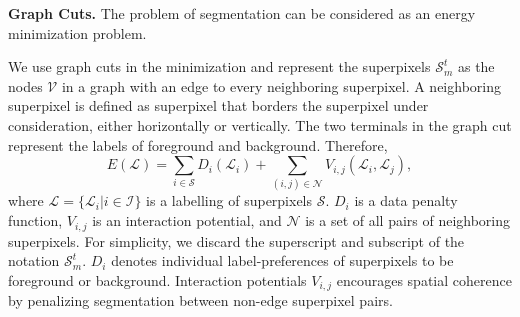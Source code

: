 \textbf{Graph Cuts.}
The problem of segmentation can be considered as an energy minimization problem.


We use graph cuts in the minimization and represent the superpixels $\mathcal{S}_{m}^{t}$ as the nodes $\mathcal{V}$ in a graph with an edge to every neighboring superpixel. A neighboring superpixel is defined as superpixel that borders the superpixel under consideration, either horizontally or vertically. The two terminals in the graph cut represent the labels of foreground and background. Therefore, 
\begin{equation}
E(\mathcal{L})=\sum_{i\in\mathcal{S}}{D_{i}(\mathcal{L}_{i})}+\sum_{(i,j)\in\mathcal{N}}{V_{i,j}(\mathcal{L}_{i},\mathcal{L}_{j})},
\end{equation}
where $\mathcal{L}=\{\mathcal{L}_{i}|i\in\mathcal{I}\}$ is a labelling of superpixels $\mathcal{S}$. $D_{i}$ is a data penalty function, $V_{i,j}$ is an interaction potential, and $\mathcal{N}$ is a set of all pairs of neighboring superpixels.
For simplicity, we discard the superscript and subscript of the notation $\mathcal{S}_{m}^{t}$.
$D_{i}$ denotes individual label-preferences of superpixels to be foreground or background.
Interaction potentials $V_{i,j}$ encourages spatial coherence by penalizing segmentation between non-edge superpixel pairs.

